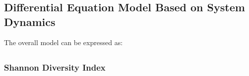 \documentclass[12pt]{article}
\begin{document}
\subsection{}

\subsubsection{}

\subsection{Differential Equation Model Based on System Dynamics}

The overall model can be expressed as:


\subsection{}

\subsubsection{Shannon Diversity Index}


\end{document}
